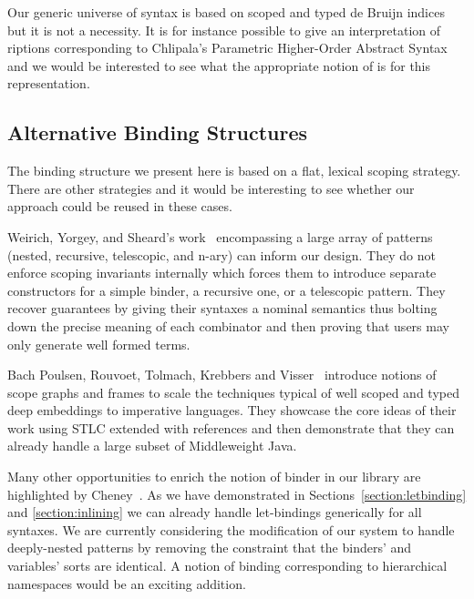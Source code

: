 {Our generic universe of syntax is based on
scoped and typed de Bruijn indices~\cite{de1972lambda} but it is not
a necessity. It is for instance possible to give an interpretation
of riptions corresponding to Chlipala's Parametric Higher-Order
Abstract Syntax~\citeyear{DBLP:conf/icfp/Chlipala08} and we would be interested
to see what the appropriate notion of  is for this representation.

\subsection{Alternative Binding Structures} The binding structure we
present here is based on a flat, lexical scoping strategy. There are
other strategies and it would be interesting to see whether
our approach could be reused in these cases.

Weirich, Yorgey, and Sheard's work~\citeyear{DBLP:conf/icfp/WeirichYS11}
encompassing a large array of patterns (nested, recursive, telescopic, and
n-ary) can inform our design. They do not enforce scoping invariants internally
which forces them to introduce separate constructors for a simple binder, a
recursive one, or a telescopic pattern. They recover guarantees by giving
their syntaxes a nominal semantics thus bolting down the precise meaning of
each combinator and then proving that users may only generate well formed
terms.

Bach Poulsen, Rouvoet, Tolmach, Krebbers and Visser~\citeyear{BachPoulsen}
introduce notions of scope graphs and frames to scale the techniques typical
of well scoped and typed deep embeddings to imperative languages.
They showcase the core ideas of their work using STLC extended with references
and then demonstrate that they can already handle a large subset of Middleweight
Java.

Many other opportunities to enrich the notion of binder in our library are
highlighted by Cheney~\citeyear{DBLP:conf/icfp/Cheney05a}. As we have demonstrated
in Sections~\ref{section:letbinding} and \ref{section:inlining} we can already
handle let-bindings generically for all syntaxes. We are currently considering
the modification of our system to handle deeply-nested patterns by removing the
constraint that the binders' and variables' sorts are identical. A notion of
binding corresponding to hierarchical namespaces would be an exciting addition.

}
